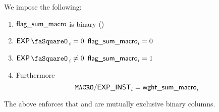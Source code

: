 We impose the following:
\begin{enumerate}
	\item  $\textsf{flag\_sum}\textsf{\_macro}$ is binary \quad (\trash)
	\item \If $\expStamp_{i} =    0$ \Then $\textsf{flag\_sum}\textsf{\_macro}_{i} = 0$
	\item \If $\expStamp_{i} \neq 0$ \Then $\textsf{flag\_sum}\textsf{\_macro}_{i} = 1$
	\item Furthermore
	      \[
		      \texttt{MACRO}\textsf{/}{\textsf{\textsf{EXP}}}\textsf{\_INST}_{i} = \textsf{wght\_sum}\textsf{\_macro}_{i}
	      \]
\end{enumerate}
\saNote{} The above enforces that \isExpLog{} and \isModexpLog{} are mutually exclusive binary columns.


